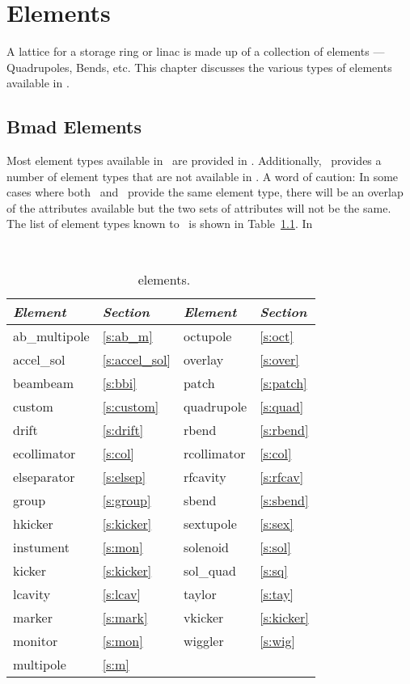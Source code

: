 \chapter{Elements}

A lattice for a storage ring or linac is made up of a collection of
elements --- Quadrupoles, Bends, etc. This chapter discusses the
various types of elements available in \bmad.

\section{Bmad Elements}

Most element types available in \mad\ are provided in \bmad.
Additionally, \bmad\ provides a number of element types that are not
available in \mad.  A word of caution: In some cases where both \mad\
and \bmad\ provide the same element type, there will be an overlap of 
the attributes available but the two sets of attributes will not be the same.
The list of element types known to \bmad\ is shown in Table~\ref{tab:elements}.
In
\begin{table}[h]
{\centering
{\tt
\begin{tabular}{|l|l||l|l|} \hline
  {\it Element} & {\it Section}     & {\it Element} & {\it Section} \\ \hline
  ab\_multipole & \ref{s:ab_m}      &  octupole     & \ref{s:oct}   \\ \hline
  accel\_sol    & \ref{s:accel_sol} &  overlay      & \ref{s:over}  \\ \hline
  beambeam      & \ref{s:bbi}       &  patch        & \ref{s:patch} \\ \hline
  custom        & \ref{s:custom}    &  quadrupole   & \ref{s:quad}  \\ \hline
  drift         & \ref{s:drift}     &  rbend        & \ref{s:rbend} \\ \hline
  ecollimator   & \ref{s:col}       &  rcollimator  & \ref{s:col}   \\ \hline
  elseparator   & \ref{s:elsep}     &  rfcavity     & \ref{s:rfcav} \\ \hline
  group         & \ref{s:group}     &  sbend        & \ref{s:sbend} \\ \hline
  hkicker       & \ref{s:kicker}    &  sextupole    & \ref{s:sex}   \\ \hline
  instument     & \ref{s:mon}       &  solenoid     & \ref{s:sol}   \\ \hline
  kicker        & \ref{s:kicker}    &  sol\_quad    & \ref{s:sq}    \\ \hline
  lcavity       & \ref{s:lcav}      &  taylor       & \ref{s:tay}   \\ \hline
  marker        & \ref{s:mark}      &  vkicker      & \ref{s:kicker}\\ \hline
  monitor       & \ref{s:mon}       &  wiggler      & \ref{s:wig}   \\ \hline
  multipole     & \ref{s:m}         &               &               \\ \hline  
\end{tabular}
}}
\caption{\bmad\ elements.}
\label{tab:elements}\center
\end{table}


